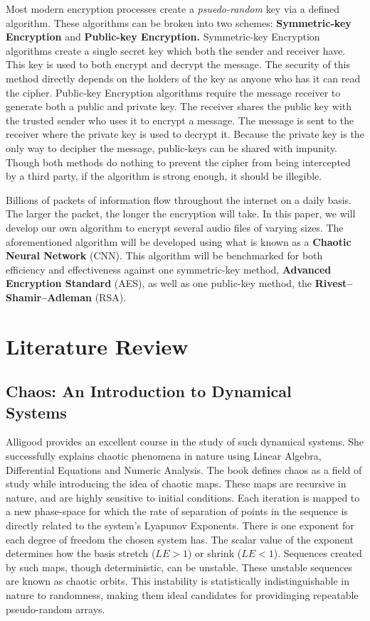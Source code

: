 \documentclass[conference]{IEEEtran}
\begin{document}
Most modern encryption processes create a \textit{psuedo-random} key via a defined algorithm.
These algorithms can be broken into two schemes: \textbf{Symmetric-key Encryption} and \textbf{Public-key Encryption.}
Symmetric-key Encryption algorithms create a single secret key which both the sender and receiver have.
This key is used to both encrypt and decrypt the message.
The security of this method directly depends on the holders of the key as anyone who has it can read the cipher.
Public-key Encryption algorithms require the message receiver to generate both a public and private key.
The receiver shares the public key with the trusted sender who uses it to encrypt a message.
The message is sent to the receiver where the private key is used to decrypt it.
Because the private key is the only way to decipher the message, public-keys can be shared with impunity.
Though both methods do nothing to prevent the cipher from being intercepted by a third party, if the algorithm is strong enough, it should be illegible.

Billions of packets of information flow throughout the internet on a daily basis.
The larger the packet, the longer the encryption will take.
In this paper, we will develop our own algorithm to encrypt several audio files of varying sizes.
The aforementioned algorithm will be developed using what is known as a \textbf{Chaotic Neural Network} (CNN).
This algorithm will be benchmarked for both efficiency and effectiveness against one symmetric-key method, \textbf{Advanced Encryption Standard} (AES), as well as one public-key method, the \textbf{Rivest–Shamir–Adleman} (RSA).

\section{Literature Review}\label{sec:literature-review}

\subsection{\textbf{Chaos: An Introduction to Dynamical Systems}~\cite{Alligood}}\label{subsec:chaos:-an-introduction-to-dynamical-systems}

Alligood provides an excellent course in the study of such dynamical systems.
She successfully explains chaotic phenomena in nature using Linear Algebra, Differential Equations and Numeric Analysis.
The book defines chaos as a field of study while introducing the idea of chaotic maps.
These maps are recursive in nature, and are highly sensitive to initial conditions.
Each iteration is mapped to a new phase-space for which the rate of separation of points in the sequence is directly related to the system's Lyapunov Exponents.
There is one exponent for each degree of freedom the chosen system has.
The scalar value of the exponent determines how the basis stretch ($LE > 1$) or shrink ($LE < 1$).
Sequences created by such maps, though deterministic, can be unstable.
These unstable sequences are known as chaotic orbits.
This instability is statistically indistinguishable in nature to randomness, making them ideal candidates for providinging repeatable pseudo-random arrays.
\end{document}
